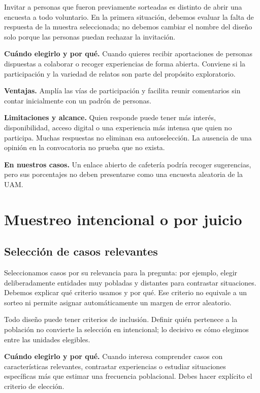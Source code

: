 \documentclass[11pt,letterpaper]{article}
\begin{document}
Invitar a personas que fueron previamente sorteadas es distinto de abrir una encuesta a todo voluntario. En la primera situación, debemos evaluar la falta de respuesta de la muestra seleccionada; no debemos cambiar el nombre del diseño solo porque las personas puedan rechazar la invitación.

\textbf{Cuándo elegirlo y por qué.} Cuando quieres recibir aportaciones de personas dispuestas a colaborar o recoger experiencias de forma abierta. Conviene si la participación y la variedad de relatos son parte del propósito exploratorio.

\textbf{Ventajas.} Amplía las vías de participación y facilita reunir comentarios sin contar inicialmente con un padrón de personas.

\textbf{Limitaciones y alcance.} Quien responde puede tener más interés, disponibilidad, acceso digital o una experiencia más intensa que quien no participa. Muchas respuestas no eliminan esa autoselección. La ausencia de una opinión en la convocatoria no prueba que no exista.

\textbf{En nuestros casos.} Un enlace abierto de cafetería podría recoger sugerencias, pero sus porcentajes no deben presentarse como una encuesta aleatoria de la UAM.
\clearpage
\section{Muestreo intencional o por juicio}

\subsection{Selección de casos relevantes}
Seleccionamos casos por su relevancia para la pregunta: por ejemplo, elegir deliberadamente entidades muy pobladas y distantes para contrastar situaciones. Debemos explicar qué criterio usamos y por qué. Ese criterio no equivale a un sorteo ni permite asignar automáticamente un margen de error aleatorio.

Todo diseño puede tener criterios de inclusión. Definir quién pertenece a la población no convierte la selección en intencional; lo decisivo es cómo elegimos entre las unidades elegibles.

\textbf{Cuándo elegirlo y por qué.} Cuando interesa comprender casos con características relevantes, contrastar experiencias o estudiar situaciones específicas más que estimar una frecuencia poblacional. Debes hacer explícito el criterio de elección.
\end{document}
